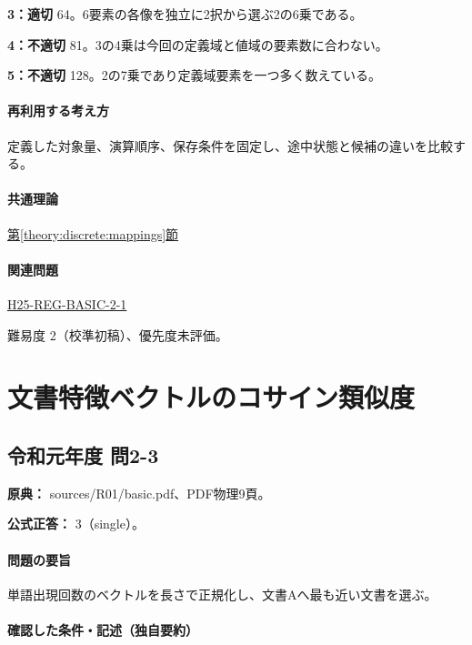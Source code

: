 \noindent\textbf{3：適切} 64。6要素の各像を独立に2択から選ぶ2の6乗である。\par

\noindent\textbf{4：不適切} 81。3の4乗は今回の定義域と値域の要素数に合わない。\par

\noindent\textbf{5：不適切} 128。2の7乗であり定義域要素を一つ多く数えている。\par

\paragraph{再利用する考え方} 定義した対象量、演算順序、保存条件を固定し、途中状態と候補の違いを比較する。

\paragraph{共通理論} \hyperref[theory:discrete:mappings]{第\ref*{theory:discrete:mappings}節}

\paragraph{関連問題} \hyperref[q:h25-reg-basic-2-1]{H25-REG-BASIC-2-1}

\par 難易度 2（校準初稿）、優先度未評価。

\section{文書特徴ベクトルのコサイン類似度}

\subsection{令和元年度 問2-3}
\label{q:r01-reg-basic-2-3}

\noindent\textbf{原典：} sources/R01/basic.pdf、PDF物理9頁。

\textbf{公式正答：} 3（single）。

\paragraph{問題の要旨} 単語出現回数のベクトルを長さで正規化し、文書Aへ最も近い文書を選ぶ。

\paragraph{確認した条件・記述（独自要約）}\mbox{}\par

